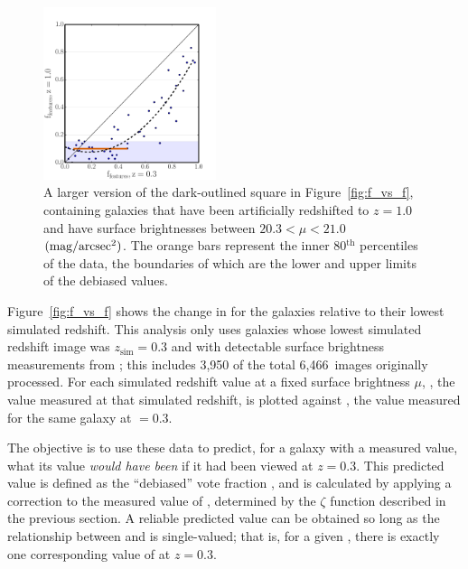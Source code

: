 \documentclass[twocolumn]{aastex6}
\begin{document}
\begin{figure}
\centering
\includegraphics[width=0.45\textwidth]{figures/z1_mu20_subplot2.pdf}
\caption{A larger version of the dark-outlined square in Figure~\ref{fig:f_vs_f}, containing
\ferengi{} galaxies that have been artificially redshifted to $z=1.0$ and have
surface brightnesses between $20.3 < \mu < 21.0$ $\rm (mag/arcsec^2)$. The orange bars represent the inner
80$^\mathrm{th}$ percentiles of the data, the boundaries of which are the lower
and upper limits of the debiased values.}
\label{fig:f_vs_f_zoom}
\end{figure}

Figure~\ref{fig:f_vs_f} shows the change in \ffeatures{} for the \ferengi{}
galaxies relative to their lowest simulated redshift. This analysis only uses
galaxies whose lowest simulated redshift image was $z_\mathrm{sim}=0.3$ and
with detectable surface brightness measurements from \sextractor{} \citep{mel16}; this includes
3,950 of the total 6,466~images originally processed. For each simulated
redshift value \zsim{} at a fixed surface brightness $\mu$, \ffeaturesz, the
value measured at that simulated redshift, is plotted against \ffeaturesrest,
the value measured for the same galaxy at \zsim$=0.3$. 
 
The objective is to use these data to predict, for a galaxy with a measured
\ffeaturesz{} value, what its \ffeatures{} value \emph{would have been} if it
had been viewed at $z=0.3$. This predicted value is defined as the ``debiased''
vote fraction \ffeaturesdebiased, and is calculated by applying a correction to
the measured value of \ffeatures, determined by the $\zeta$ function described
in the previous section. A reliable predicted value can be obtained so long as
the relationship between \ffeaturesz{} and \ffeaturesrest{} is single-valued;
that is, for a given \ffeaturesz, there is exactly one corresponding value of
\ffeatures{} at $z=0.3$. 
\end{document}
